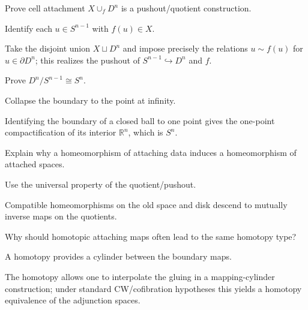 \begin{exercise}\label{exr:viii05-ped-06}
Prove cell attachment $X\cup_f D^n$ is a pushout/quotient construction.
\end{exercise}
\begin{hint}
Identify each $u\in S^{n-1}$ with $f(u)\in X$.
\end{hint}
\begin{solution}
Take the disjoint union $X\sqcup D^n$ and impose precisely the relations $u\sim f(u)$ for $u\in\partial D^n$; this realizes the pushout of $S^{n-1}\hookrightarrow D^n$ and $f$.
\end{solution}

\begin{exercise}\label{exr:viii05-ped-07}
Prove $D^n/S^{n-1}\cong S^n$.
\end{exercise}
\begin{hint}
Collapse the boundary to the point at infinity.
\end{hint}
\begin{solution}
Identifying the boundary of a closed ball to one point gives the one-point compactification of its interior $\mathbb R^n$, which is $S^n$.
\end{solution}

\begin{exercise}\label{exr:viii05-ped-08}
Explain why a homeomorphism of attaching data induces a homeomorphism of attached spaces.
\end{exercise}
\begin{hint}
Use the universal property of the quotient/pushout.
\end{hint}
\begin{solution}
Compatible homeomorphisms on the old space and disk descend to mutually inverse maps on the quotients.
\end{solution}

\begin{exercise}\label{exr:viii05-ped-09}
Why should homotopic attaching maps often lead to the same homotopy type?
\end{exercise}
\begin{hint}
A homotopy provides a cylinder between the boundary maps.
\end{hint}
\begin{solution}
The homotopy allows one to interpolate the gluing in a mapping-cylinder construction; under standard CW/cofibration hypotheses this yields a homotopy equivalence of the adjunction spaces.
\end{solution}

